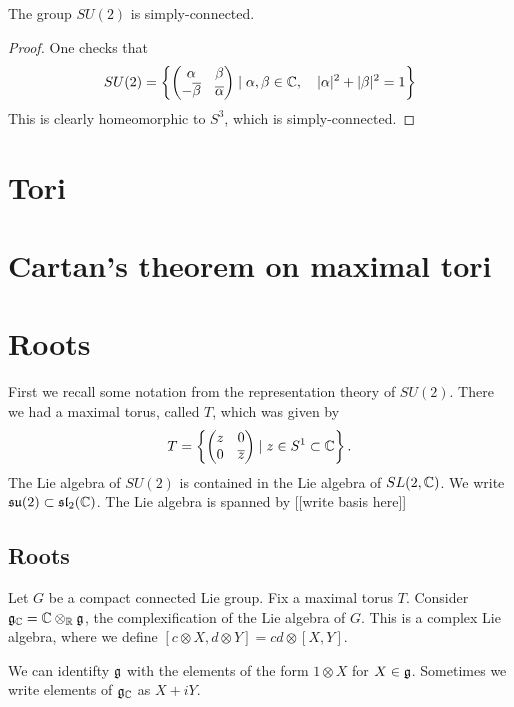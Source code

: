 \documentclass[11pt, english]{article}
\begin{document}
\begin{lemma}
The group $SU(2)$ is simply-connected.
\end{lemma}
\begin{proof}
One checks that
$$
SU(2) =\left\{ \begin{pmatrix}
\alpha & \beta \\
-\overline \beta & \overline \alpha 
\end{pmatrix}
\mid \alpha, \beta \in \mathbb{C}, \quad |\alpha|^2 + |\beta|^2 = 1
\right\}
$$
This is clearly homeomorphic to $S^3$, which is simply-connected.
\end{proof}


\newpage
\section{Tori}

\newpage
\section{Cartan's theorem on maximal tori}


\newpage
\section{Roots}

First we recall some notation from the representation theory of $SU(2)$. There we had a maximal torus, called $T$, which was given by
$$
T = \left\{ \begin{pmatrix} z & 0 \\ 0 & \overline z
\end{pmatrix} \mid z \in S^1 \subset \mathbb{C} \right\}.
$$
The Lie algebra of $SU(2)$ is contained in the Lie algebra of $SL(2,\mathbb{C})$. We write $\mathfrak{su}(2) \subset \mathfrak{sl}_2(\mathbb{C})$. The Lie algebra is spanned by [[write basis here]]

\subsection{Roots}

Let $G$ be a compact connected Lie group. Fix a maximal torus $T$. Consider $\mathfrak g_{\mathbb{C}}=\mathbb{C} \otimes_{\mathbb{R}} \mathfrak g$, the complexification of the Lie algebra of $G$. This is a complex Lie algebra, where we define $[c \otimes X, d \otimes Y]=cd \otimes [X,Y]$.

We can identifty $\mathfrak g$ with the elements of the form $1 \otimes X$ for $X \in \mathfrak g$. Sometimes we write elements of $\mathfrak g_{\mathbb{C}}$ as $X+iY$.
\end{document}
